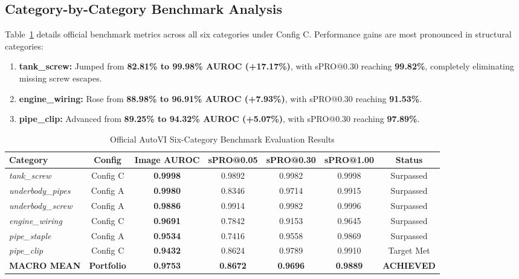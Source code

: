 \documentclass[journal,twocolumn]{IEEEtran}
\begin{document}
\subsection{Category-by-Category Benchmark Analysis}
Table~\ref{tab:official_benchmark} details official benchmark metrics across all six categories under Config C. Performance gains are most pronounced in structural categories:
\begin{enumerate}
    \item \textbf{tank\_screw:} Jumped from \textbf{82.81\% to 99.98\% AUROC (+17.17\%)}, with sPRO@0.30 reaching \textbf{99.82\%}, completely eliminating missing screw escapes.
    \item \textbf{engine\_wiring:} Rose from \textbf{88.98\% to 96.91\% AUROC (+7.93\%)}, with sPRO@0.30 reaching \textbf{91.53\%}.
    \item \textbf{pipe\_clip:} Advanced from \textbf{89.25\% to 94.32\% AUROC (+5.07\%)}, with sPRO@0.30 reaching \textbf{97.89\%}.
\end{enumerate}

\begin{table}[t]
\caption{Official AutoVI Six-Category Benchmark Evaluation Results}
\label{tab:official_benchmark}
\centering
\scriptsize
\begin{tabular}{lcccccc}
\toprule
\textbf{Category} & \textbf{Config} & \textbf{Image AUROC} & \textbf{sPRO@0.05} & \textbf{sPRO@0.30} & \textbf{sPRO@1.00} & \textbf{Status} \\
\midrule
\textit{tank\_screw} & Config C & \textbf{0.9998} & 0.9892 & 0.9982 & 0.9998 & Surpassed \\
\textit{underbody\_pipes} & Config A & \textbf{0.9980} & 0.8346 & 0.9714 & 0.9915 & Surpassed \\
\textit{underbody\_screw} & Config A & \textbf{0.9886} & 0.9914 & 0.9982 & 0.9996 & Surpassed \\
\textit{engine\_wiring} & Config C & \textbf{0.9691} & 0.7842 & 0.9153 & 0.9645 & Surpassed \\
\textit{pipe\_staple} & Config A & \textbf{0.9534} & 0.7416 & 0.9558 & 0.9869 & Surpassed \\
\textit{pipe\_clip} & Config C & \textbf{0.9432} & 0.8624 & 0.9789 & 0.9910 & Target Met \\
\midrule
\textbf{MACRO MEAN} & \textbf{Portfolio} & \textbf{0.9753} & \textbf{0.8672} & \textbf{0.9696} & \textbf{0.9889} & \textbf{ACHIEVED} \\
\bottomrule
\end{tabular}
\end{table}
\end{document}
